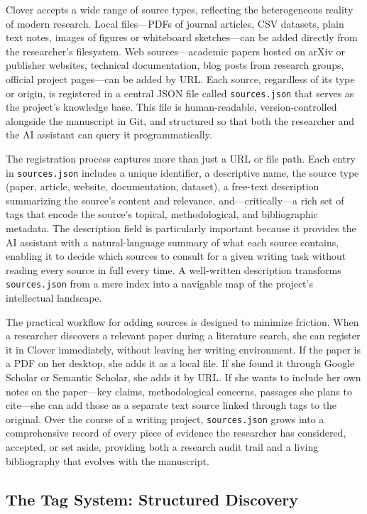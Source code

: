 \documentclass[a4paper,11pt]{article}
\begin{document}
Clover accepts a wide range of source types, reflecting the heterogeneous reality of modern research. Local files---PDFs of journal articles, CSV datasets, plain text notes, images of figures or whiteboard sketches---can be added directly from the researcher's filesystem. Web sources---academic papers hosted on arXiv or publisher websites, technical documentation, blog posts from research groups, official project pages---can be added by URL. Each source, regardless of its type or origin, is registered in a central JSON file called \texttt{sources.json} that serves as the project's knowledge base. This file is human-readable, version-controlled alongside the manuscript in Git, and structured so that both the researcher and the AI assistant can query it programmatically.

The registration process captures more than just a URL or file path. Each entry in \texttt{sources.json} includes a unique identifier, a descriptive name, the source type (paper, article, website, documentation, dataset), a free-text description summarizing the source's content and relevance, and---critically---a rich set of tags that encode the source's topical, methodological, and bibliographic metadata. The description field is particularly important because it provides the AI assistant with a natural-language summary of what each source contains, enabling it to decide which sources to consult for a given writing task without reading every source in full every time. A well-written description transforms \texttt{sources.json} from a mere index into a navigable map of the project's intellectual landscape.

The practical workflow for adding sources is designed to minimize friction. When a researcher discovers a relevant paper during a literature search, she can register it in Clover immediately, without leaving her writing environment. If the paper is a PDF on her desktop, she adds it as a local file. If she found it through Google Scholar or Semantic Scholar, she adds it by URL. If she wants to include her own notes on the paper---key claims, methodological concerns, passages she plans to cite---she can add those as a separate text source linked through tags to the original. Over the course of a writing project, \texttt{sources.json} grows into a comprehensive record of every piece of evidence the researcher has considered, accepted, or set aside, providing both a research audit trail and a living bibliography that evolves with the manuscript.

\subsection{The Tag System: Structured Discovery}
\end{document}
